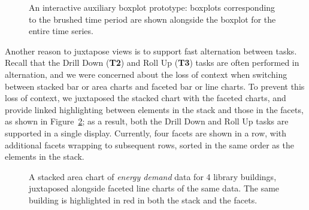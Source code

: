 \documentclass[journal]{vgtc}                %
\newcommand{\bstart}[1]{\vspace{1mm} \noindent{\textbf{#1:}}}
\begin{document}
\begin{figure}[ht]
    \vspace{-0.3cm}
	\centering
	\vspace{-0.15cm}
	\caption{An interactive auxiliary boxplot prototype: boxplots corresponding to the brushed time period are shown alongside the boxplot for the entire time series.}
	\label{fig:interactive-boxplots}
	\vspace{-0.3cm}
\end{figure}

\bstart{Juxtaposed stack and facets} Another reason to juxtapose views is to support fast alternation between tasks.
Recall that the Drill Down ({\bf T2}) and Roll Up ({\bf T3}) tasks are often performed in alternation, and we were concerned about the loss of context when switching between stacked bar or area charts and faceted bar or line charts.
To prevent this loss of context, we juxtaposed the stacked chart with the faceted charts, and provide linked highlighting between elements in the stack and those in the facets, as shown in Figure~\ref{fig:sandbox-stacks}; as a result, both the Drill Down and Roll Up tasks are supported in a single display.
Currently, four facets are shown in a row, with additional facets wrapping to subsequent rows, sorted in the same order as the elements in the stack.

\begin{figure}[ht!]
    \vspace{-0.3cm}
	\centering
	\vspace{-0.15cm}
	\caption{A stacked area chart of \textsl{energy demand} data for 4 library buildings, juxtaposed alongside faceted line charts of the same data. The same building is highlighted in red in both the stack and the facets.}
	\label{fig:sandbox-stacks}
	\vspace{-0.3cm}
\end{figure}
\end{document}
